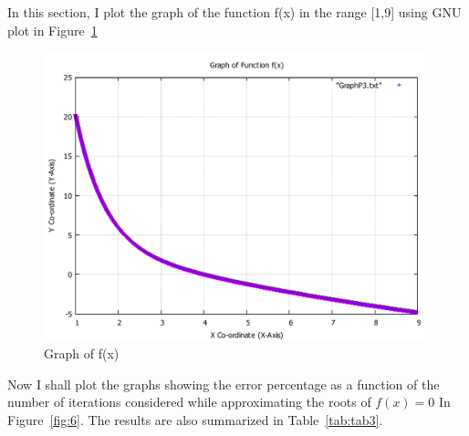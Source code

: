 \documentclass[titlepage, 11pt]{article}
\begin{document}
In this section, I plot the graph of the function f(x) in the range [1,9] using GNU plot in Figure~\ref{fig:5}
\begin{figure}
  \centering
    \includegraphics[width=\linewidth]{GraphP3.pdf}
    \caption{Graph of f(x)}
    \label{fig:5}
\end{figure}

Now I shall plot the graphs showing the error percentage as a function of the number of iterations considered while approximating the roots of $f(x)=0$ In Figure~\ref{fig:6}. The results are also summarized in Table~\ref{tab:tab3}.
\end{document}
